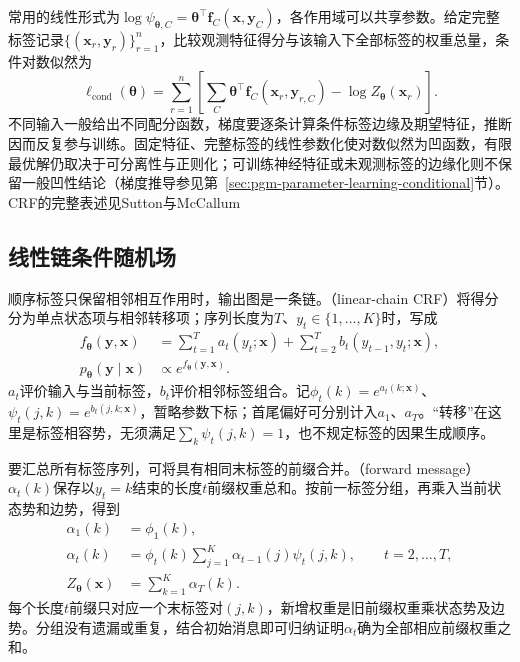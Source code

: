 常用的线性形式为$\log\psi_{\bm{\theta},C}=\bm{\theta}^\top\bm{f}_C(\bm{x},\bm{y}_C)$，各作用域可以共享参数。给定完整标签记录$\{(\bm{x}_r,\bm{y}_r)\}_{r=1}^n$，比较观测特征得分与该输入下全部标签的权重总量，条件对数似然为
\begin{equation}
  \ell_{\mathrm{cond}}(\bm{\theta})
    =\sum_{r=1}^n
       \left[
        \sum_C\bm{\theta}^\top
                    \bm{f}_C(\bm{x}_r,\bm{y}_{r,C})
        -\log Z_{\bm{\theta}}(\bm{x}_r)
       \right].
  \label{eq:pgm-energy-models-crf-likelihood}
\end{equation}
不同输入一般给出不同配分函数，梯度要逐条计算条件标签边缘及期望特征，推断因而反复参与训练。固定特征、完整标签的线性参数化使对数似然为凹函数，有限最优解仍取决于可分离性与正则化；可训练神经特征或未观测标签的边缘化则不保留一般凹性结论（梯度推导参见第~\ref{sec:pgm-parameter-learning-conditional}节）。CRF的完整表述见Sutton与McCallum

\subsection{线性链条件随机场}
\label{sec:pgm-energy-models-linear-chain}

顺序标签只保留相邻相互作用时，输出图是一条链。（linear-chain CRF）将得分分为单点状态项与相邻转移项；序列长度为$T$、$y_t\in\{1,\ldots,K\}$时，写成
\begin{equation}
  \begin{aligned}
    f_{\bm{\theta}}(\bm{y},\bm{x})
      &=\sum_{t=1}^T a_t(y_t;\bm{x})
        +\sum_{t=2}^T b_t(y_{t-1},y_t;\bm{x}),\\
    p_{\bm{\theta}}(\bm{y}\mid\bm{x})
      &\propto e^{f_{\bm{\theta}}(\bm{y},\bm{x})}.
  \end{aligned}
  \label{eq:pgm-energy-models-chain-score}
\end{equation}
$a_t$评价输入与当前标签，$b_t$评价相邻标签组合。记$\phi_t(k)=e^{a_t(k;\bm{x})}$、$\psi_t(j,k)=e^{b_t(j,k;\bm{x})}$，暂略参数下标；首尾偏好可分别计入$a_1$、$a_T$。“转移”在这里是标签相容势，无须满足$\sum_k\psi_t(j,k)=1$，也不规定标签的因果生成顺序。

要汇总所有标签序列，可将具有相同末标签的前缀合并。（forward message）$\alpha_t(k)$保存以$y_t=k$结束的长度$t$前缀权重总和。按前一标签分组，再乘入当前状态势和边势，得到
\begin{equation}
  \begin{aligned}
    \alpha_1(k)&=\phi_1(k),\\
    \alpha_t(k)&=\phi_t(k)
       \sum_{j=1}^K\alpha_{t-1}(j)\psi_t(j,k),
       \qquad t=2,\ldots,T,\\
    Z_{\bm{\theta}}(\bm{x})&=\sum_{k=1}^K\alpha_T(k).
  \end{aligned}
  \label{eq:pgm-energy-models-forward}
\end{equation}
每个长度$t$前缀只对应一个末标签对$(j,k)$，新增权重是旧前缀权重乘状态势及边势。分组没有遗漏或重复，结合初始消息即可归纳证明$\alpha_t$确为全部相应前缀权重之和。

